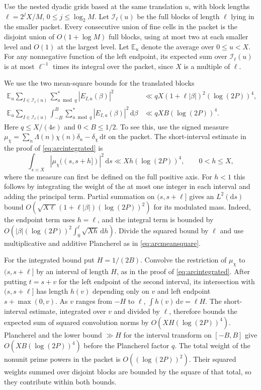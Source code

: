 \documentclass[11pt,a4paper]{article}
\numberwithin{equation}{section}
\newcommand{\ud}{\mathrm d}
\begin{document}
Use the nested dyadic grids based at the same translation $u$,
with block lengths $\ell=2^j X/M$, $0\le j\le\log_2 M$.
Let $\mathcal I_\ell(u)$ be the full blocks of length $\ell$
lying in the smaller packet. Every consecutive union of
fine cells in the packet is the disjoint union of
$O(1+\log M)$ full blocks, using at most two at each
smaller level and $O(1)$ at the largest level.
Let $\mathbb E_u$ denote the average over $0\le u<X$.
For any nonnegative function of the left endpoint, its
expected sum over $\mathcal I_\ell(u)$ is at most
$\ell^{-1}$ times its integral over the packet, since
$X$ is a multiple of $\ell$.

We use the two mean-square bounds for the translated blocks
\begin{equation}
 \begin{split}
 \mathbb E_u\sum_{I\in\mathcal I_\ell(u)}
    \sum_{a\bmod q}^{*}|E_{I,a}(\beta)|^2
       &\ll qX(1+\ell|\beta|)^2(\log(2P))^4,\\
 \mathbb E_u\sum_{I\in\mathcal I_\ell(u)}
    \int_{-B}^B\sum_{a\bmod q}^{*}|E_{I,a}(\beta)|^2\,\ud\beta
       &\ll qXB(\log(2P))^4 .
 \end{split}
 \label{eq:translatedblocks}
\end{equation}
Here $q\le X/(4e)$ and $0<B\le1/2$. To see this, use
the signed measure
$\mu_\chi=\sum_n\Lambda(n)\chi(n)\delta_n-\delta_\chi\,\ud t$
on the packet. The short-interval estimate in the proof
of \cref{eq:arcintegrated} is
\[
 \int_{s\asymp X}|\mu_\chi((s,s+h])|^2\,\ud s
      \ll Xh(\log(2P))^4,\qquad 0<h\le X,
\]
where the measure can first be defined on the full positive
axis. For $h<1$ this follows by integrating the weight of
the at most one integer in each interval and adding the
principal term. Partial summation on $(s,s+\ell]$ gives
an $L^2(\ud s)$ bound
$O(\sqrt{X\ell}(1+\ell|\beta|)(\log(2P))^2)$
for its modulated mass. Indeed, the endpoint term uses
$h=\ell$, and the integral term is bounded by
$O(|\beta|(\log(2P))^2\int_0^\ell \sqrt{Xh}\,\ud h)$.
Divide the squared bound by $\ell$ and use multiplicative
and additive Plancherel as in \cref{eq:arcmeansquare}.

For the integrated bound put $H=1/(2B)$. Convolve the
restriction of $\mu_\chi$ to $(s,s+\ell]$ by an interval
of length $H$, as in the proof of \cref{eq:arcintegrated}.
After putting $t=s+v$ for the left endpoint of the second
interval, its intersection with $(s,s+\ell]$ has length
$h(v)$ depending only on $v$ and left endpoint
$s+\max(0,v)$. As $v$ ranges from $-H$ to $\ell$,
$\int h(v)\,\ud v=\ell H$. The short-interval estimate,
integrated over $v$ and divided by $\ell$, therefore
bounds the expected sum of squared convolution norms by
$O(XH(\log(2P))^4)$. Plancherel and the lower bound
$\gg H$ for the interval transform on $[-B,B]$ give
$O(XB(\log(2P))^4)$ before the Plancherel factor $q$.
The total weight of the nonunit prime powers in the
packet is $O((\log(2P))^2)$. Their squared weights summed
over disjoint blocks are bounded by the square of that
total, so they contribute within both bounds.
\end{document}
